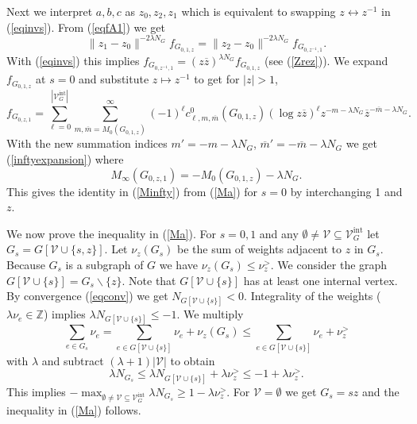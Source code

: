 \documentclass[oneside]{amsart}
\newcommand{\ZZ}{{\mathbb Z}}
\newcommand{\mm}{{\overline{m}}}
\newcommand{\zz}{{\overline{z}}}
\newcommand{\sV}{\mathcal{V}}
\newcommand{\sVGint}{{\sV_G^\mathrm{int}}}
\newcommand{\VGint}{{|\sVGint|}}
\theoremstyle{plain}
\begin{document}
Next we interpret $a,b,c$ as $z_0,z_2,z_1$ which is equivalent to swapping $z\leftrightarrow z^{-1}$ in (\ref{eqinvs}). From (\ref{eqfA1}) we get
$$
\|z_1-z_0\|^{-2\lambda N_G}f_{G_{0,1,z}}=\|z_2-z_0\|^{-2\lambda N_G}f_{G_{0,z^{-1},1}}.
$$
With (\ref{eqinvs}) this implies $f_{G_{0,z^{-1},1}}=(z\zz)^{\lambda N_G}f_{G_{0,1,z}}$ (see (\ref{Zrez})).
We expand $f_{G_{0,1,z}}$ at $s=0$ and substitute $z\mapsto z^{-1}$ to get for $|z|>1$,
$$
f_{G_{0,z,1}}=\sum_{\ell=0}^\VGint\sum_{m,\mm=M_0(G_{0,1,z})}^\infty (-1)^\ell c_{\ell,m,\mm}^0(G_{0,1,z})(\log z\zz)^\ell z^{-m-\lambda N_G}\zz^{-\mm-\lambda N_G}.
$$
With the new summation indices $m'=-m-\lambda N_G$, $\mm'=-\mm-\lambda N_G$ we get (\ref{inftyexpansion}) where
$$
M_\infty(G_{0,z,1})=-M_0(G_{0,1,z})-\lambda N_G.
$$
This gives the identity in (\ref{Minfty}) from (\ref{Ma}) for $s=0$ by interchanging 1 and $z$.

We now prove the inequality in (\ref{Ma}). For $s=0,1$ and any $\emptyset\neq\sV\subseteq\sVGint$ let $G_s=G[\sV\cup\{s,z\}]$.
Let $\nu_z(G_s)$ be the sum of weights adjacent to $z$ in $G_s$. Because $G_s$ is a subgraph of $G$ we have $\nu_z(G_s)\leq\nu_z^>$.
We consider the graph $G[\sV\cup\{s\}]=G_s\backslash\{z\}$. Note that $G[\sV\cup\{s\}]$ has at least one internal vertex.
By convergence (\ref{eqconv}) we get $N_{G[\sV\cup\{s\}]}<0$. Integrality of the weights ($\lambda\nu_e\in\ZZ$) implies $\lambda N_{G[\sV\cup\{s\}]}\leq-1$.
We multiply
$$
\sum_{e\in G_s}\nu_e=\sum_{e\in G[\sV\cup\{s\}]}\nu_e+\nu_z(G_s)\leq\sum_{e\in G[\sV\cup\{s\}]}\nu_e+\nu_z^>
$$
with $\lambda$ and subtract $(\lambda+1)|\sV|$ to obtain
$$
\lambda N_{G_s}\leq\lambda N_{G[\sV\cup\{s\}]}+\lambda\nu_z^>\leq-1+\lambda\nu_z^>.
$$
This implies $-\max_{\emptyset\neq\sV\subseteq\sVGint}\lambda N_{G_s}\geq1-\lambda\nu_z^>$. For $\sV=\emptyset$ we get $G_s=sz$ and the inequality in (\ref{Ma}) follows.
\end{document}
